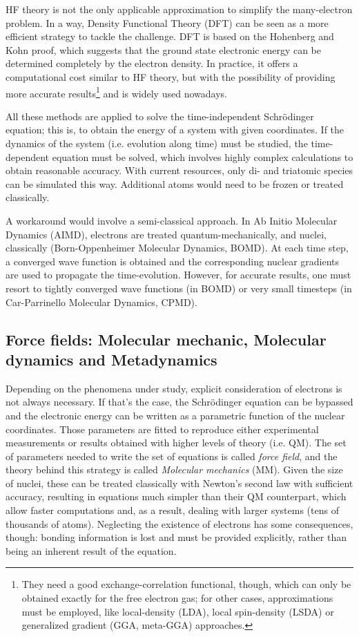 HF theory is not the only applicable approximation to simplify the many-electron problem. In a way, Density Functional Theory (DFT) can be seen as a more efficient strategy to tackle the challenge. DFT is based on the Hohenberg and Kohn proof, which suggests that the ground state electronic energy can be determined completely by the electron density. In practice, it offers a computational cost similar to HF theory, but with the possibility of providing more accurate results\footnote{They need a good exchange-correlation functional, though, which can only be obtained exactly for the free electron gas; for other cases, approximations must be employed, like local-density (LDA), local spin-density (LSDA) or generalized gradient (GGA, meta-GGA) approaches.} and is widely used nowadays.

All these methods are applied to solve the time-independent Schrödinger equation; this is, to obtain the energy of a system with given coordinates. If the dynamics of the system (i.e. evolution along time) must be studied, the time-dependent equation must be solved, which involves highly complex calculations to obtain reasonable accuracy. With current resources, only di- and triatomic species can be simulated this way. Additional atoms would need to be frozen or treated classically.

A workaround would involve a semi-classical approach. In Ab Initio Molecular Dynamics (AIMD), electrons are treated quantum-mechanically, and nuclei, classically (Born-Oppenheimer Molecular Dynamics, BOMD). At each time step, a converged wave function is obtained and the corresponding nuclear gradients are used to propagate the time-evolution. However, for accurate results, one must resort to tightly converged wave functions (in BOMD) or very small timesteps (in Car-Parrinello Molecular Dynamics, CPMD).

\subsection{Force fields: Molecular mechanic, Molecular dynamics and Metadynamics}
\label{section:mm-md}
Depending on the phenomena under study, explicit consideration of electrons is not always necessary. If that's the case, the Schrödinger equation can be bypassed and the electronic energy can be written as a parametric function of the nuclear coordinates. Those parameters are fitted to reproduce either experimental measurements or results obtained with higher levels of theory (i.e. QM). The set of parameters needed to write the set of equations is called \textit{force field}, and the theory behind this strategy is called \textit{Molecular mechanics} (MM). Given the size of nuclei, these can be treated classically with Newton's second law with sufficient accuracy, resulting in equations much simpler than their QM counterpart, which allow faster computations and, as a result, dealing with larger systems (tens of thousands of atoms). Neglecting the existence of electrons has some consequences, though: bonding information is lost and must be provided explicitly, rather than being an inherent result of the equation.


